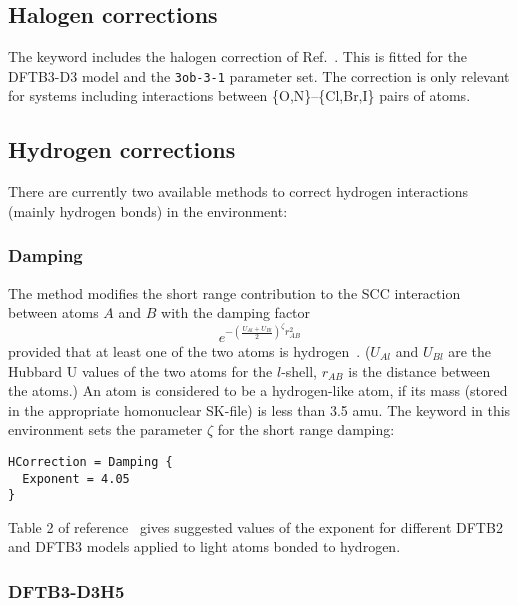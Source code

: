 \subsection{Halogen corrections}
\label{sec:dftbp.xcorr}

The  keyword includes the halogen correction of
Ref.~\cite{kubillus-jctc-11-332}. This is fitted for the DFTB3-D3 model and the
{\tt 3ob-3-1} parameter set. The correction is only relevant for systems
including interactions between \{O,N\}--\{Cl,Br,I\} pairs of atoms.


\subsection{Hydrogen corrections}
\label{sec:dftbp.hcorr}

There are currently two available methods to correct hydrogen interactions
(mainly hydrogen bonds) in the  environment:

\subsubsection{Damping}

The  method modifies the short range contribution to the SCC
interaction between atoms $A$ and $B$ with the damping factor
\begin{equation*}
  e^{-\left(\frac{U_{Al} + U_{Bl}}{2}\right)^\zeta r_{AB}^2}
\end{equation*}
provided that at least one of the two atoms is
hydrogen~\cite{gauss-jctc-7-931,yang-JPCA-111-10861}. ($U_{Al}$ and $U_{Bl}$ are
the Hubbard U values of the two atoms for the $l$-shell, $r_{AB}$ is the
distance between the atoms.) An atom is considered to be a hydrogen-like atom,
if its mass (stored in the appropriate homonuclear SK-file) is less than 3.5
amu.  The  keyword in this environment sets the parameter $\zeta$
for the short range damping:
\begin{verbatim}
HCorrection = Damping {
  Exponent = 4.05
}
\end{verbatim}
Table 2 of reference~\cite{gauss-jctc-7-931} gives suggested values of the
exponent for different DFTB2 and DFTB3 models applied to light atoms bonded to
hydrogen.

\subsubsection{DFTB3-D3H5}


